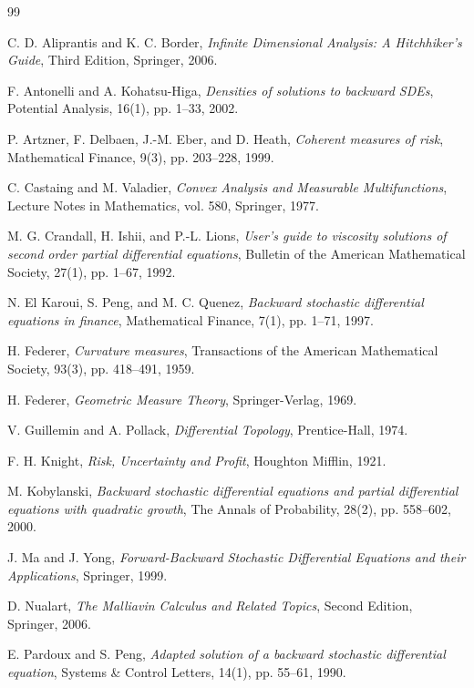 \documentclass[12pt, letterpaper]{amsart}
\theoremstyle{plain}
\theoremstyle{definition}
\theoremstyle{remark}
\numberwithin{equation}{section} %
\begin{document}
\begin{thebibliography}{99}

C. D. Aliprantis and K. C. Border,
\textit{Infinite Dimensional Analysis: A Hitchhiker's Guide}, Third Edition,
Springer, 2006.

F. Antonelli and A. Kohatsu-Higa,
\textit{Densities of solutions to backward SDEs},
Potential Analysis, 16(1), pp. 1--33, 2002.

P. Artzner, F. Delbaen, J.-M. Eber, and D. Heath,
\textit{Coherent measures of risk},
Mathematical Finance, 9(3), pp. 203--228, 1999.

C. Castaing and M. Valadier,
\textit{Convex Analysis and Measurable Multifunctions},
Lecture Notes in Mathematics, vol. 580, Springer, 1977.

M. G. Crandall, H. Ishii, and P.-L. Lions,
\textit{User's guide to viscosity solutions of second order partial differential equations},
Bulletin of the American Mathematical Society, 27(1), pp. 1--67, 1992.

N. El Karoui, S. Peng, and M. C. Quenez,
\textit{Backward stochastic differential equations in finance},
Mathematical Finance, 7(1), pp. 1--71, 1997.

H. Federer,
\textit{Curvature measures},
Transactions of the American Mathematical Society, 93(3), pp. 418--491, 1959.

H. Federer,
\textit{Geometric Measure Theory},
Springer-Verlag, 1969.

V. Guillemin and A. Pollack,
\textit{Differential Topology},
Prentice-Hall, 1974.

F. H. Knight,
\textit{Risk, Uncertainty and Profit},
Houghton Mifflin, 1921.

M. Kobylanski,
\textit{Backward stochastic differential equations and partial differential equations with quadratic growth},
The Annals of Probability, 28(2), pp. 558--602, 2000.

J. Ma and J. Yong,
\textit{Forward-Backward Stochastic Differential Equations and their Applications},
Springer, 1999.

D. Nualart,
\textit{The Malliavin Calculus and Related Topics}, Second Edition,
Springer, 2006.

E. Pardoux and S. Peng,
\textit{Adapted solution of a backward stochastic differential equation},
Systems \& Control Letters, 14(1), pp. 55--61, 1990.


\end{thebibliography}
\end{document}
